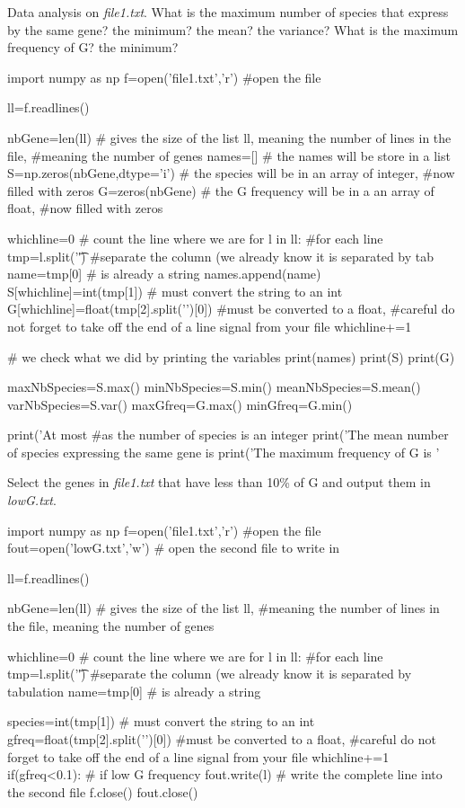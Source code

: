 \documentclass[article,10pt]{scrartcl}
\begin{document}
Data analysis on \textit{file1.txt}. What is the maximum number of species that express by the same gene? the minimum? the mean? the variance? What is the maximum frequency of G? the minimum?\\
\begin{python}
import numpy as np
f=open('file1.txt','r') #open the file

ll=f.readlines()

nbGene=len(ll) # gives the size of the list ll, meaning the number of lines in the file, 
#meaning the number of genes
names=[] # the names will be store in a list
S=np.zeros(nbGene,dtype='i') # the species will be in an array of integer, 
#now filled with zeros
G=zeros(nbGene) # the G frequency will be in a an array of float, 
#now filled with zeros

whichline=0 # count the line where we are
for l in ll: #for each line
   tmp=l.split('\t') #separate the column (we already know it is separated by tab
   name=tmp[0] # is already a string
   names.append(name)
   S[whichline]=int(tmp[1]) # must convert the string to an int
   G[whichline]=float(tmp[2].split('\n')[0])  #must be converted to a float, 
   #careful do not forget to take off the end of a line signal from your file
   whichline+=1

# we check what we did by printing the variables
print(names) 
print(S)
print(G)

maxNbSpecies=S.max()
minNbSpecies=S.min()
meanNbSpecies=S.mean()
varNbSpecies=S.var()
maxGfreq=G.max()
minGfreq=G.min()

print('At most %
#as the number of species is an integer
print('The mean number of species expressing the same gene is %
print('The maximum frequency of G is %
'%
\end{python}
Select the genes in \textit{file1.txt} that have less than 10\% of G and output them in \textit{lowG.txt}.
\begin{python}
import numpy as np
f=open('file1.txt','r') #open the file
fout=open('lowG.txt','w') # open the second file to write in

ll=f.readlines()

nbGene=len(ll) # gives the size of the list ll, 
#meaning the number of lines in the file, meaning the number of genes

whichline=0 # count the line where we are
for l in ll: #for each line
   tmp=l.split('\t') #separate the column (we already know it is separated by tabulation
   name=tmp[0] # is already a string
   
   species=int(tmp[1]) # must convert the string to an int
   gfreq=float(tmp[2].split('\n')[0])  #must be converted to a float, 
#careful do not forget to take off the end of a line signal from your file
   whichline+=1
   if(gfreq<0.1): # if low G frequency
      fout.write(l) # write the complete line into the second file
f.close()
fout.close()
\end{python}
\end{document}
